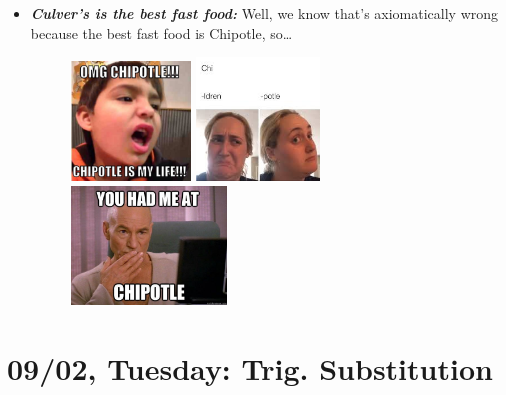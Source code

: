 \documentclass[11pt,letterpaper]{article}
\begin{document}
\begin{itemize}
\item {\bfseries\itshape Culver's is the best fast food:} Well, we know that's axiomatically wrong because the best fast food is Chipotle, so\dots
	\begin{figure}[H]
	\centering
	\includegraphics[width=0.3\textwidth]{images/chipotle1.jpg}%
	\includegraphics[width=0.31\textwidth]{images/chipotle2.jpeg}%
	\includegraphics[width=0.39\textwidth]{images/chipotle3.jpg}%
	\end{figure}
\end{itemize}

\newpage
\section*{09/02, Tuesday: Trig. Substitution\label{09-02}}
\end{document}
